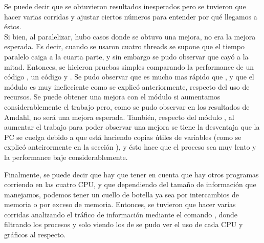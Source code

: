 Se puede decir que se obtuvieron resultados inesperados pero se tuvieron que hacer
varias corridas y ajustar ciertos números para entender por qué llegamos a
éstos.\\
Si bien, al paralelizar, hubo casos donde se obtuvo una mejora, no era la mejora
esperada. Es decir, cuando se usaron cuatro threads se supone que el tiempo paralelo
caiga a la cuarta parte, y sin embargo se pudo observar que cayó a la mitad. Entonces,
se hicieron pruebas simples comparando la performance de un código , un
código  y . Se pudo observar que 
es mucho mas rápido que , y que el módulo  es muy inefieciente
como se explicó anteriormente, respecto del uso de recursos. Se puede obtener una mejora
con el módulo  si aumentamos considerablemente el trabajo pero, como
se pudo observar en los resultados de Amdahl, no será una mejora esperada.
También, respecto del módulo , al aumentar el trabajo para poder observar
una mejora se tiene la desventaja que la PC se cuelga debido a que 
está haciendo copias útiles de variables (como se explicó anteirormente en la
sección ), y ésto hace que el proceso sea muy lento
y la performance baje considerablemente.

Finalmente, se puede decir que hay que tener en cuenta que hay otros programas
corriendo en las cuatro CPU, y que dependiendo del tamaño de información que
manejamos, podemos tener un cuello de botella ya sea por intercambios de memoria
o por exceso de memoria.
Entonces, se tuvieron que hacer varias corridas analizando el tráfico de
información mediante el comando , donde filtrando
los procesos y solo viendo los de  se pudo ver el uso de cada CPU
y gráficos al respecto.
